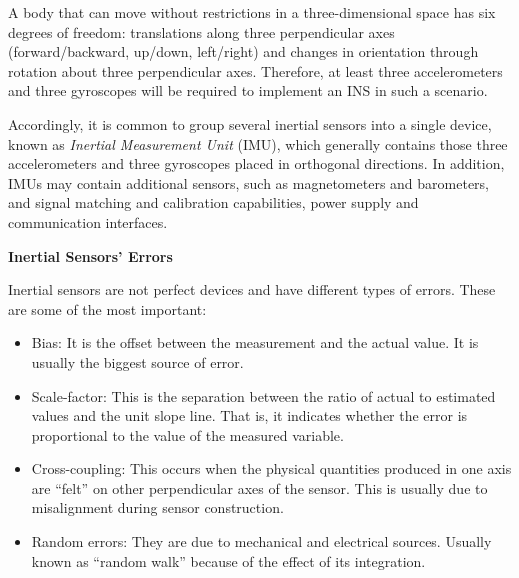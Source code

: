\begin{description}
	A body that can move without restrictions in a three-dimensional space has six degrees of freedom: translations along three perpendicular axes (forward/backward, up/down, left/right) and changes in orientation through rotation about three perpendicular axes.
	Therefore, at least three accelerometers and three gyroscopes will be required to implement an INS in such a scenario.
	
	Accordingly, it is common to group several inertial sensors into a single device, known as \emph{Inertial Measurement Unit} (IMU), which generally contains those three accelerometers and three gyroscopes placed in orthogonal directions.
	In addition, IMUs may contain additional sensors, such as magnetometers and barometers, and signal matching and calibration capabilities, power supply and communication interfaces.	
	\item \textbf{Inertial Sensors' Errors}
	
	Inertial sensors are not perfect devices and have different types of errors. These are some of the most important:
	\begin{itemize}
		\item Bias: It is the offset between the measurement and the actual value. It is usually the biggest source of error.
		\item Scale-factor: This is the separation between the ratio of actual to estimated values and the unit slope line. That is, it indicates whether the error is proportional to the value of the measured variable. 
		\item Cross-coupling: This occurs when the physical quantities produced in one axis are ``felt'' on other perpendicular axes of the sensor. This is usually due to misalignment during sensor construction.
		\item Random errors: They are due to mechanical and electrical sources. Usually known as ``random walk'' because of the effect of its integration.
	\end{itemize}	
	

\end{description}
